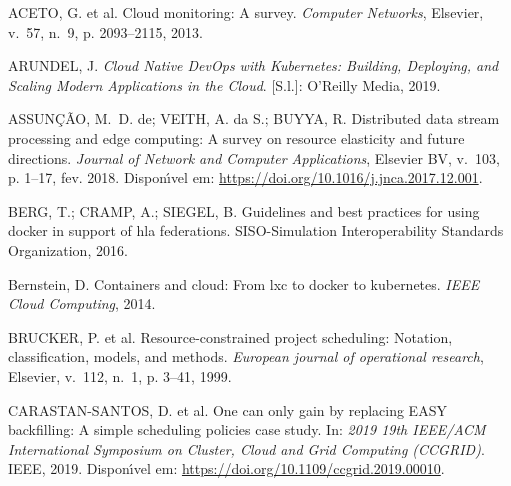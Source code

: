 \documentclass[
	12pt,				%
	openright,			%
	oneside,			%
	a4paper,			%
	brazil				%
	]{abntex2}
\providecommand{\DIFaddbegin}{} %
\providecommand{\DIFaddend}{} %
\providecommand{\DIFdelbegin}{} %
\providecommand{\DIFdelend}{} %
\newcommand{\DIFscaledelfig}{0.5}
\newlength{\DIFdelgraphicswidth} %
\newlength{\DIFdelgraphicsheight} %
\newcommand{\DIFaddincludegraphics}[2][]{{\color{blue}\fbox{\DIFOincludegraphics[#1]{#2}}}} %
\newcommand{\DIFdelincludegraphics}[2][]{%
\sbox{\DIFdelgraphicsbox}{\DIFOincludegraphics[#1]{#2}}%
\settoboxwidth{\DIFdelgraphicswidth}{\DIFdelgraphicsbox} %
\settoboxtotalheight{\DIFdelgraphicsheight}{\DIFdelgraphicsbox} %
\scalebox{\DIFscaledelfig}{%
\parbox[b]{\DIFdelgraphicswidth}{\usebox{\DIFdelgraphicsbox}\\[-\baselineskip] \rule{\DIFdelgraphicswidth}{0em}}\llap{\resizebox{\DIFdelgraphicswidth}{\DIFdelgraphicsheight}{%
\setlength{\unitlength}{\DIFdelgraphicswidth}%
\begin{picture}(1,1)%
\thicklines\linethickness{2pt} %
{\color[rgb]{1,0,0}\put(0,0){\framebox(1,1){}}}%
{\color[rgb]{1,0,0}\put(0,0){\line( 1,1){1}}}%
{\color[rgb]{1,0,0}\put(0,1){\line(1,-1){1}}}%
\end{picture}%
}\hspace*{3pt}}} %
} %
\DeclareRobustCommand{\DIFaddbegin}{\DIFOaddbegin \let\includegraphics\DIFaddincludegraphics} %
\DeclareRobustCommand{\DIFaddend}{\DIFOaddend \let\includegraphics\DIFOincludegraphics} %
\DeclareRobustCommand{\DIFdelbegin}{\DIFOdelbegin \let\includegraphics\DIFdelincludegraphics} %
\DeclareRobustCommand{\DIFdelend}{\DIFOaddend \let\includegraphics\DIFOincludegraphics} %
\begin{document}
\providecommand{\abntreprintinfo}[1]{%
 \citeonline{#1}}
\setlength{\labelsep}{0pt}\begin{thebibliography}{}
\providecommand{\abntrefinfo}[3]{}
\providecommand{\abntbstabout}[1]{}
\DIFdelbegin %
\DIFdelend \DIFaddbegin \abntbstabout{v-1.9.6 }
\DIFaddend 

\abntrefinfo{Aceto et al.}{ACETO et al.}{2013}
{ACETO, G. et al. Cloud monitoring: A survey.
\emph{Computer Networks}, Elsevier, v.~57, n.~9, p. 2093--2115, 2013.}

\abntrefinfo{Arundel}{ARUNDEL}{2019}
{ARUNDEL, J. \emph{Cloud Native DevOps with Kubernetes: Building, Deploying,
  and Scaling Modern Applications in the Cloud}. [S.l.]: O'Reilly Media, 2019.}

\abntrefinfo{Assun{\c{c}}{\~{a}}o, Veith e Buyya}{ASSUN{\c{C}}{\~{A}}O; VEITH;
  BUYYA}{2018}
{ASSUN{\c{C}}{\~{A}}O, M.~D. de; VEITH, A. da S.; BUYYA, R. Distributed data
  stream processing and edge computing: A survey on resource elasticity and
  future directions.
\emph{Journal of Network and Computer Applications}, Elsevier {BV}, v.~103, p.
  1--17, fev. 2018.
Dispon{\'\i}vel em: \url{https://doi.org/10.1016/j.jnca.2017.12.001}.}

\abntrefinfo{Berg, Cramp e Siegel}{BERG; CRAMP; SIEGEL}{2016}
{BERG, T.; CRAMP, A.; SIEGEL, B. Guidelines and best practices for using docker
  in support of hla federations.
SISO-Simulation Interoperability Standards Organization, 2016.}

\abntrefinfo{{Bernstein}}{{Bernstein}}{2014}
{{Bernstein}, D. Containers and cloud: From lxc to docker to kubernetes.
\emph{IEEE Cloud Computing}, 2014.}

\abntrefinfo{Brucker et al.}{BRUCKER et al.}{1999}
{BRUCKER, P. et al. Resource-constrained project scheduling: Notation,
  classification, models, and methods.
\emph{European journal of operational research}, Elsevier, v.~112, n.~1, p.
  3--41, 1999.}

\abntrefinfo{Carastan-Santos et al.}{CARASTAN-SANTOS et al.}{2019}
{CARASTAN-SANTOS, D. et al. One can only gain by replacing {EASY} backfilling:
  A simple scheduling policies case study. In:  \emph{2019 19th {IEEE}/{ACM}
  International Symposium on Cluster, Cloud and Grid Computing ({CCGRID})}.
  {IEEE}, 2019. Dispon{\'\i}vel em:
  \url{https://doi.org/10.1109/ccgrid.2019.00010}.}


\end{thebibliography}
\end{document}

